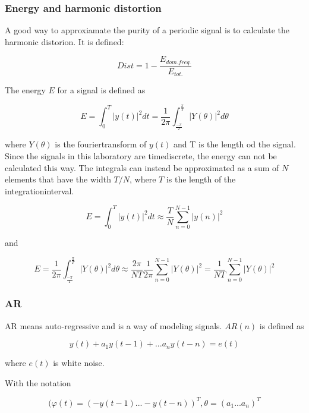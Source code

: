 \documentclass[12pt]{article}
\begin{document}
\subsubsection{Energy and harmonic distortion}
A good way to approxiamate the purity of a periodic signal is to calculate the harmonic distorion. It is defined:

 \begin{equation}Dist = 1-\frac{E_{dom. freq.}}{E_{tot.}}\end{equation}

The energy $E$ for a signal is defined as

\begin{equation}E=\int_{0}^T \vert y(t)\vert ^2 dt=\frac{1}{2\pi}\int_{\frac{-\pi}{T}}^{\frac{\pi}{T}}\vert Y(\theta)\vert ^2d\theta \end{equation}

where $Y(\theta)$ is the fouriertransform of $y(t)$ and T is the length od the signal. Since the signals in this laboratory are timediscrete, the energy can not be calculated this way. The integrals can instead be approximated as a sum of $N$ elements that have the width $T/N$, where $T$ is the length of the integrationinterval.

\begin{equation}
E=\int_{0}^T \vert y(t)\vert^2 dt\approx \frac{T}{N}\sum_{n=0}^{N-1}\vert y(n) \vert^2 
\label{A} 
\end{equation}

and

\begin{equation}
E=\frac{1}{2\pi}\int_{\frac{-\pi}{T}}^{\frac{\pi}{T}}\vert Y(\theta)\vert ^2d\theta \approx \frac{2\pi}{NT}\frac{1}{2\pi}\sum_{n=0}^{N-1}\vert Y(\theta) \vert^2=\frac{1}{NT}\sum_{n=0}^{N-1}\vert Y(\theta) \vert^2 
\end{equation}

\subsubsection{AR}
AR means auto-regressive and is a way of modeling signals. $AR(n)$ is defined as

\begin{equation} y(t)+a_1y(t-1)+...a_ny(t-n)=e(t) \end{equation}

where $e(t)$ is white noise.

With the notation

\begin{equation}
(\varphi(t) =(-y(t-1) ... -y(t-n))^T,\theta = (a_1 ... a_n)^T 
\end{equation}
\end{document}
